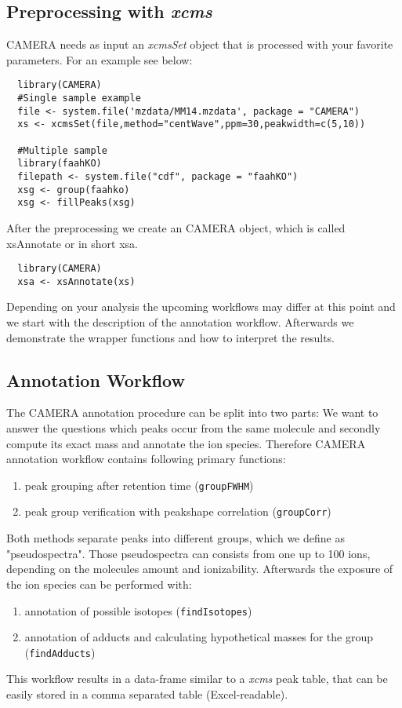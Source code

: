 \documentclass[a4paper,12pt]{article}
\newcommand{\Rfunction}[1]{{\texttt{#1}}}
\newcommand{\Rpackage}[1]{{\textit{#1}}}
\newcommand{\Rclass}[1]{{\textit{#1}}}
\begin{document}
\subsection{Preprocessing with \Rpackage{xcms}}
\label{preprocess}

CAMERA needs as input an \Rclass{xcmsSet} object that is processed with your
favorite parameters. For an example see below:
\begin{verbatim}
  library(CAMERA)
  #Single sample example
  file <- system.file('mzdata/MM14.mzdata', package = "CAMERA")
  xs <- xcmsSet(file,method="centWave",ppm=30,peakwidth=c(5,10))

  #Multiple sample
  library(faahKO)
  filepath <- system.file("cdf", package = "faahKO")
  xsg <- group(faahko)
  xsg <- fillPeaks(xsg)
\end{verbatim}

After the preprocessing we create an CAMERA object, which is called xsAnnotate
or in short xsa. 
\begin{verbatim}
  library(CAMERA)
  xsa <- xsAnnotate(xs)
\end{verbatim}
Depending on your analysis the upcoming workflows may differ at this point and
we start with the description of the annotation workflow. Afterwards we
demonstrate the wrapper functions and how to interpret the results.

\subsection{Annotation Workflow}

The CAMERA annotation procedure can be split into two parts: We want to
answer the questions which peaks occur from the same molecule and
secondly compute its exact mass and annotate the ion species. 
Therefore CAMERA annotation workflow contains following primary functions:
\begin{enumerate}
 \item peak grouping after retention time (\Rfunction{groupFWHM})
 \item peak group verification with peakshape correlation
(\Rfunction{groupCorr})
\end{enumerate}
Both methods separate peaks into different groups, which we define as
"pseudospectra". Those pseudospectra can consists from one up to 100 ions,
depending on the molecules amount and ionizability.
Afterwards the exposure of the ion species can be performed with:
\begin{enumerate}
 \item annotation of possible isotopes (\Rfunction{findIsotopes})
 \item annotation of adducts and calculating hypothetical masses for the group
(\Rfunction{findAdducts})
\end{enumerate}
This workflow results in a data-frame similar to a \Rpackage{xcms} peak table,
that can be easily stored in a comma separated table
(Excel-readable).
\end{document}
